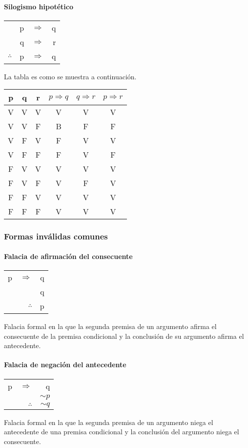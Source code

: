 \documentclass[10pt]{book} 						%
\begin{document}
\paragraph{Silogismo hipotético}
\begin{center}
\begin{tabular}{r r r r}
&p & $\Rightarrow$ & q\\
&q&$\Rightarrow$&r\\
\hline
$\therefore$&p&$\Rightarrow$&q\\
\end{tabular}
\end{center}
La tabla es como se muestra a continuación.
\begin{center}
\begin{tabular}{c c c c c c}
p  & q & r & $p\Rightarrow q$ & $q \Rightarrow r$ & $p\Rightarrow r$\\
\hline
V&V&V&V&V&V\\
V&V&F&B&F&F\\
V&F&V&F&V&V\\
V&F&F&F&V&F\\
F&V&V&V&V&V\\
F&V&F&V&F&V\\
F&F&V&V&V&V\\
F&F&F&V&V&V\\
\end{tabular}
\end{center}
\subsubsection{Formas inválidas comunes}
\paragraph{Falacia de afirmación del consecuente}
\begin{center}
\begin{tabular}{r r r}
p & $\Rightarrow$ & q\\
&& q \\
\hline
&$\therefore$&p\\
\end{tabular}
\end{center}
Falacia formal en la que la segunda premisa de un argumento afirma el consecuente de la premisa condicional y la conclusión de su argumento afirma el antecedente.

\paragraph{Falacia de negación del antecedente}
\begin{center}
\begin{tabular}{r r r}
p & $\Rightarrow$ & q\\
&& $\sim p$ \\
\hline
&$\therefore$&$\sim q$\\
\end{tabular}
\end{center}
Falacia formal en la que la segunda premisa de un argumento niega el antecedente de una premisa condicional y la conclusión del argumento niega el consecuente.
\end{document}
